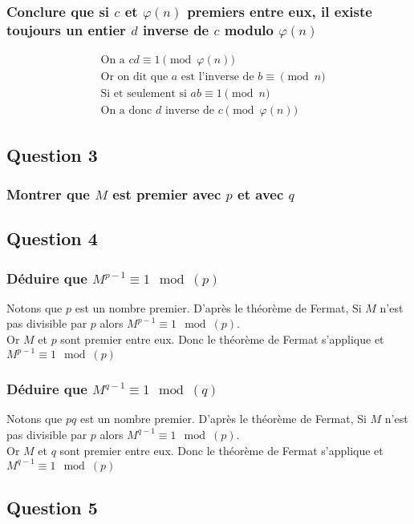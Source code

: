 \documentclass[a4paper,10pt]{article}
\begin{document}
\subsubsection{Conclure que si $c$ et $\varphi(n)$ premiers entre eux, il existe toujours un entier $d$ inverse de $c$ modulo $\varphi(n)$}

\begin{align*}
&\text{On a } cd \equiv 1 \pmod{\varphi(n)}\\
&\text{Or on dit que $a$ est l'inverse de $b \equiv \pmod n$}\\
&\text{Si et seulement si $ab \equiv 1 \pmod n$}\\
&\text{On a donc $d$ inverse de $c \pmod{\varphi(n)}$}
\end{align*}

\subsection{Question 3}
\subsubsection{Montrer que $M$ est premier avec $p$ et avec $q$}


\subsection{Question 4}
\subsubsection{Déduire que $M^{p-1} \equiv 1 \mod(p)$}
Notons que $p$ est un nombre premier.
D'après le théorème de Fermat, Si $M$ n’est pas divisible par $p$ alors $M^{p-1} \equiv 1 \mod(p)$.\\
Or $M$ et $p$ sont premier entre eux.
Donc le théorème de Fermat s'applique et $M^{p-1} \equiv 1 \mod(p)$

\subsubsection{Déduire que $M^{q-1} \equiv 1 \mod(q)$}
Notons que $pq$ est un nombre premier.
D'après le théorème de Fermat, Si $M$ n’est pas divisible par $p$ alors $M^{q-1} \equiv 1 \mod(p)$.\\
Or $M$ et $q$ sont premier entre eux.
Donc le théorème de Fermat s'applique et $M^{q-1} \equiv 1 \mod(p)$

\subsection{Question 5}
\end{document}
